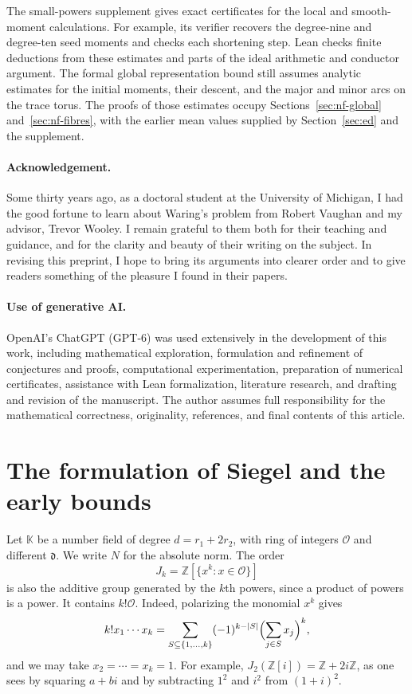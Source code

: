 \documentclass[11pt,letterpaper]{article}
\theoremstyle{definition}
\numberwithin{equation}{section}
\begin{document}
The small-powers supplement gives exact certificates for the local
and smooth-moment calculations. For example, its verifier recovers the
degree-nine and degree-ten seed moments and checks each shortening step.
Lean checks finite deductions from these estimates and parts of the
ideal arithmetic and conductor argument. The formal global representation
bound still assumes analytic estimates for the initial moments, their
descent, and the major and minor arcs on the trace torus. The proofs
of those estimates occupy Sections~\ref{sec:nf-global} and~\ref{sec:nf-fibres},
with the earlier mean values supplied by Section~\ref{sec:ed} and the supplement.

\paragraph{Acknowledgement.}
Some thirty years ago, as a doctoral student at the University of Michigan,
I had the good fortune to learn about Waring's problem from Robert Vaughan
and my advisor, Trevor Wooley. I remain grateful to them both for their
teaching and guidance, and for the clarity and beauty of their writing
on the subject. In revising this preprint, I hope to bring its arguments
into clearer order and to give readers something of the pleasure I found
in their papers.

\paragraph{Use of generative AI.}
OpenAI's ChatGPT (GPT-6) was used extensively in the
development of this work, including mathematical exploration,
formulation and refinement of conjectures and proofs,
computational experimentation, preparation of numerical
certificates, assistance with Lean formalization, literature
research, and drafting and revision of the manuscript.
The author
assumes full responsibility for the mathematical correctness,
originality, references, and final contents of this article.


\section{The formulation of Siegel and the early bounds}\label{sec:history}
Let $\mathbb K$ be a number field of degree $d=r_1+2r_2$, with ring of
integers $\mathcal O$ and different $\mathfrak d$. We write $N$ for the
absolute norm. The order
\[
 J_k=\mathbb Z[\{x^k:x\in\mathcal O\}]
\]
is also the additive group generated by the $k$th powers, since a product
of powers is a power. It contains $k!\mathcal O$. Indeed, polarizing
the monomial $x^k$ gives
\[
 k!x_1\cdots x_k
 =\sum_{S\subseteq\{1,\dots,k\}}(-1)^{k-|S|}
       \Bigl(\sum_{j\in S}x_j\Bigr)^k,
\]
and we may take $x_2=\cdots=x_k=1$. For example,
$J_2(\mathbb Z[i])=\mathbb Z+2i\mathbb Z$, as one sees by squaring
$a+bi$ and by subtracting $1^2$ and $i^2$ from $(1+i)^2$.
\end{document}
